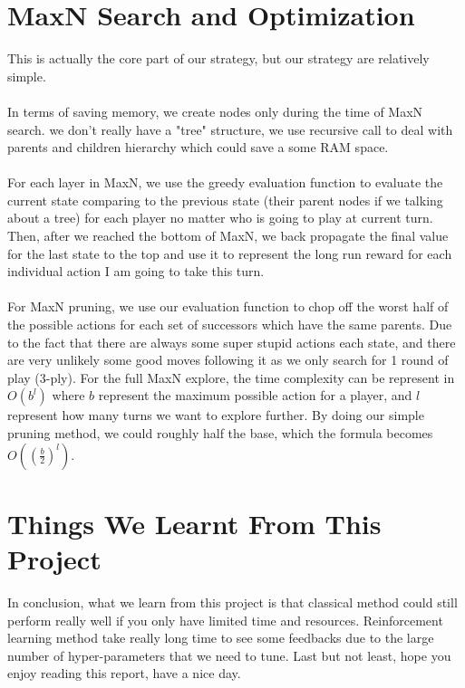 \documentclass[11pt]{article}
\begin{document}
\section{MaxN Search and Optimization}
This is actually the core part of our strategy, but our strategy are relatively simple. 
\\
\\
In terms of saving memory, we create nodes only during the time of MaxN search.
we don't really have a "tree" structure, we use recursive call to deal with parents and children 
hierarchy which could save a some RAM space.
\\
\\
For each layer in MaxN, we use the greedy evaluation function to evaluate the current state comparing to the previous state 
(their parent nodes if we talking about a tree)
for each player no matter who is going to play at current turn. Then, after we reached the bottom of MaxN, we back propagate the 
final value for the last state to the top and use it to represent the long run reward for each individual action I am going to take 
this turn.
\\
\\
For MaxN pruning, we use our evaluation function to chop off the worst 
half of the possible actions for each set of successors which have the same parents. Due to the fact that there are always
some super stupid actions each state, and there are very unlikely some good moves following it as we only search for 1 round of
play (3-ply). 
For the full MaxN explore, the time complexity can be represent in $O(b^l)$ 
where $b$ represent the maximum possible action for a player, and $l$ represent how many turns we want to explore further.
By doing our simple pruning method, we could roughly half the base, which the formula becomes $O((\frac{b}{2})^l)$.

\section{Things We Learnt From This Project}
In conclusion, what we learn from this project is that classical method could still perform really well 
if you only have limited time and resources. Reinforcement learning method take really long time to see some 
feedbacks due to the large number of hyper-parameters that we need to tune. 
Last but not least, hope you enjoy reading this report, have a nice day.
\end{document}
